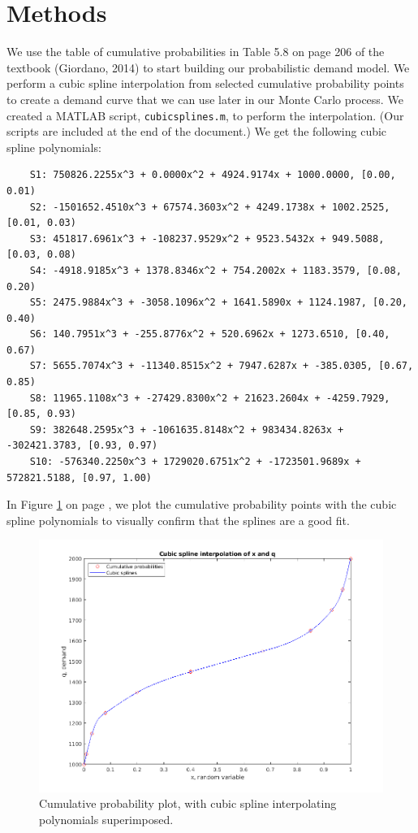 \documentclass{article}
\begin{document}
    \section*{Methods}
    We use the table of cumulative probabilities in Table 5.8 on page 206 of the textbook (Giordano, 2014) to start building our probabilistic demand model. We perform a cubic spline interpolation from selected cumulative probability points to create a demand curve that we can use later in our Monte Carlo process. We created a MATLAB script, \texttt{cubicsplines.m}, to perform the interpolation. (Our scripts are included at the end of the document.) We get the following cubic spline polynomials:
    \begin{verbatim}
    S1: 750826.2255x^3 + 0.0000x^2 + 4924.9174x + 1000.0000, [0.00, 0.01)
    S2: -1501652.4510x^3 + 67574.3603x^2 + 4249.1738x + 1002.2525, [0.01, 0.03)
    S3: 451817.6961x^3 + -108237.9529x^2 + 9523.5432x + 949.5088, [0.03, 0.08)
    S4: -4918.9185x^3 + 1378.8346x^2 + 754.2002x + 1183.3579, [0.08, 0.20)
    S5: 2475.9884x^3 + -3058.1096x^2 + 1641.5890x + 1124.1987, [0.20, 0.40)
    S6: 140.7951x^3 + -255.8776x^2 + 520.6962x + 1273.6510, [0.40, 0.67)
    S7: 5655.7074x^3 + -11340.8515x^2 + 7947.6287x + -385.0305, [0.67, 0.85)
    S8: 11965.1108x^3 + -27429.8300x^2 + 21623.2604x + -4259.7929, [0.85, 0.93)
    S9: 382648.2595x^3 + -1061635.8148x^2 + 983434.8263x + -302421.3783, [0.93, 0.97)
    S10: -576340.2250x^3 + 1729020.6751x^2 + -1723501.9689x + 572821.5188, [0.97, 1.00)\end{verbatim}
    In Figure \ref{fig:cubicsplines} on page \pageref{fig:cubicsplines}, we plot the cumulative probability points with the cubic spline polynomials to visually confirm that the splines are a good fit.
    \begin{figure}[p]
        \centering
        \includegraphics[width=\textwidth]{cubicsplines.png}
        \caption{Cumulative probability plot, with cubic spline interpolating polynomials superimposed.}
        \label{fig:cubicsplines}
    \end{figure}
\end{document}
